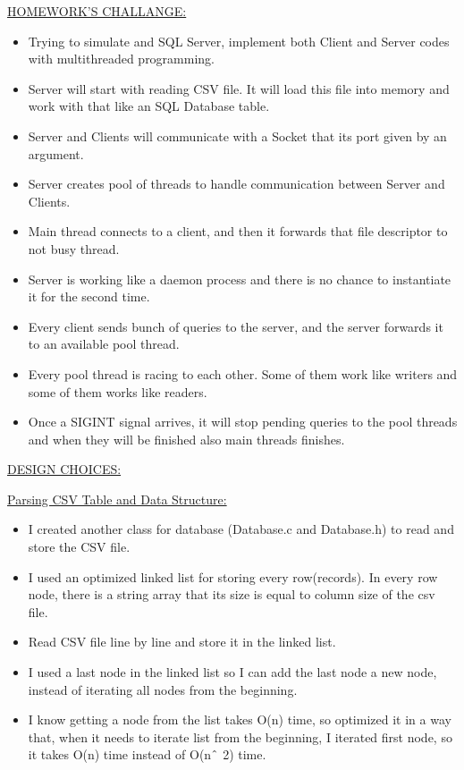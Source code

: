 \documentclass[12pt]{article}
\renewcommand{\_}{\kern-1.5pt\textunderscore\kern-1.5pt}
\begin{document}
\vspace{\baselineskip}

\vspace{\baselineskip}
\newpage
\begin{justify}
{\fontsize{16pt}{19.2pt}\selectfont \uline{HOMEWORK’S CHALLANGE:}}
\end{justify}
\begin{itemize}
	\item Trying to simulate and SQL Server, implement both Client and Server codes with multithreaded programming.
	\item Server will start with reading CSV file. It will load this file into memory and work with that like an SQL Database table.
	\item Server and Clients will communicate with a Socket that its port given by an argument.
	\item Server creates pool of threads to handle communication between Server and Clients.
	\item Main thread connects to a client, and then it forwards that file descriptor to not busy thread.
	\item Server is working like a daemon process and there is no chance to instantiate it for the second time.
	\item Every client sends bunch of queries to the server, and the server forwards it to an available pool thread. 
	\item Every pool thread is racing to each other. Some of them work like writers and some of them works like readers. 
	\item Once a SIGINT signal arrives, it will stop pending queries to the pool threads and when they will be finished also main threads finishes.
\end{itemize}

\newpage
\vspace{\baselineskip}
\begin{justify}
{\fontsize{16pt}{19.2pt}\selectfont \uline{DESIGN CHOICES:}}
\end{justify}
\begin{justify}
{\fontsize{14pt}{16.8pt}\selectfont \uline{Parsing CSV Table and Data Structure:}}
\end{justify}
\begin{itemize}
	\item I created another class for database (Database.c and Database.h) to read and store the CSV file.
	\item I used an optimized linked list for storing every row(records). In every row node, there is a string array that its size is equal to column size of the csv file.
	\item Read CSV file line by line and store it in the linked list.
	\item I used a last node in the linked list so I can add the last node a new node, instead of iterating all nodes from the beginning.
	\item I know getting a node from the list takes O(n) time, so optimized it in a way that, when it needs to iterate list from the beginning, I iterated first node, so it takes O(n) time instead of O(n$ \string^ $ 2) time.
\end{itemize}
\end{document}
